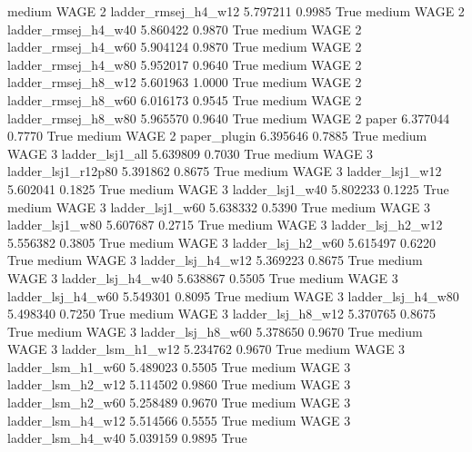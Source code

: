     medium     WAGE                 2    ladder_rmsej_h4_w12   5.797211      0.9985    True
    medium     WAGE                 2    ladder_rmsej_h4_w40   5.860422      0.9870    True
    medium     WAGE                 2    ladder_rmsej_h4_w60   5.904124      0.9870    True
    medium     WAGE                 2    ladder_rmsej_h4_w80   5.952017      0.9640    True
    medium     WAGE                 2    ladder_rmsej_h8_w12   5.601963      1.0000    True
    medium     WAGE                 2    ladder_rmsej_h8_w60   6.016173      0.9545    True
    medium     WAGE                 2    ladder_rmsej_h8_w80   5.965570      0.9640    True
    medium     WAGE                 2                  paper   6.377044      0.7770    True
    medium     WAGE                 2           paper_plugin   6.395646      0.7885    True
    medium     WAGE                 3        ladder_lsj1_all   5.639809      0.7030    True
    medium     WAGE                 3     ladder_lsj1_r12p80   5.391862      0.8675    True
    medium     WAGE                 3        ladder_lsj1_w12   5.602041      0.1825    True
    medium     WAGE                 3        ladder_lsj1_w40   5.802233      0.1225    True
    medium     WAGE                 3        ladder_lsj1_w60   5.638332      0.5390    True
    medium     WAGE                 3        ladder_lsj1_w80   5.607687      0.2715    True
    medium     WAGE                 3      ladder_lsj_h2_w12   5.556382      0.3805    True
    medium     WAGE                 3      ladder_lsj_h2_w60   5.615497      0.6220    True
    medium     WAGE                 3      ladder_lsj_h4_w12   5.369223      0.8675    True
    medium     WAGE                 3      ladder_lsj_h4_w40   5.638867      0.5505    True
    medium     WAGE                 3      ladder_lsj_h4_w60   5.549301      0.8095    True
    medium     WAGE                 3      ladder_lsj_h4_w80   5.498340      0.7250    True
    medium     WAGE                 3      ladder_lsj_h8_w12   5.370765      0.8675    True
    medium     WAGE                 3      ladder_lsj_h8_w60   5.378650      0.9670    True
    medium     WAGE                 3      ladder_lsm_h1_w12   5.234762      0.9670    True
    medium     WAGE                 3      ladder_lsm_h1_w60   5.489023      0.5505    True
    medium     WAGE                 3      ladder_lsm_h2_w12   5.114502      0.9860    True
    medium     WAGE                 3      ladder_lsm_h2_w60   5.258489      0.9670    True
    medium     WAGE                 3      ladder_lsm_h4_w12   5.514566      0.5555    True
    medium     WAGE                 3      ladder_lsm_h4_w40   5.039159      0.9895    True
